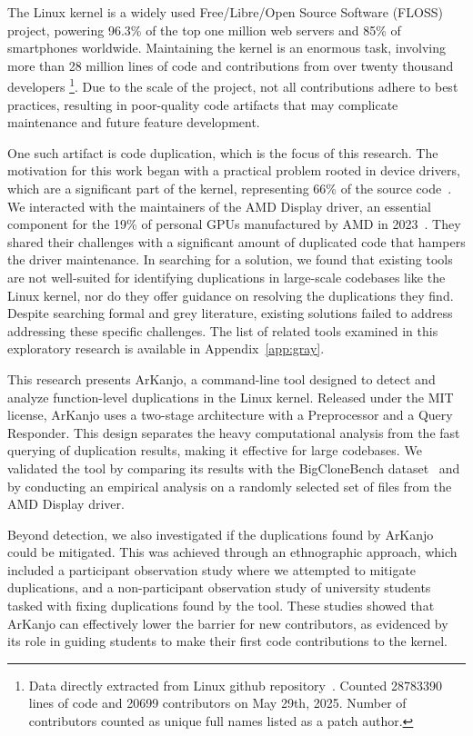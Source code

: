 \en

The Linux kernel is a widely used Free/Libre/Open Source Software (FLOSS) project, 
powering 96.3\% of the top one million web servers and 85\% of smartphones worldwide. 
Maintaining the kernel is an enormous task, involving more than 28 million lines of 
code and contributions from over twenty thousand developers
\footnote{Data directly extracted from Linux github repository~\citep{linuxrepo}.
Counted  28783390 lines of code and 20699 contributors on May 29th, 2025.
Number of contributors counted as unique full names listed as a patch author.}.
Due to the scale of the project, not all contributions adhere to best practices, resulting 
in poor-quality code artifacts that may complicate maintenance and future feature development.

One such artifact is code duplication, which is the focus of this research. The motivation for 
this work began with a practical problem rooted in device drivers, which are a significant part 
of the kernel, representing 66\% of the source code~\citep{marcelo}. We interacted with the 
maintainers of the AMD Display driver, an essential component for the 19\% of personal GPUs 
manufactured by AMD in 2023~\citep{gpumarket}. They shared their challenges with a significant 
amount of duplicated code that hampers the driver maintenance. In searching for a solution, 
we found that existing tools are not well-suited for identifying duplications in large-scale 
codebases like the Linux kernel, nor do they offer guidance on resolving the duplications 
they find. Despite searching formal and grey literature, existing solutions failed to address
addressing these specific challenges. The list of related tools examined in this exploratory 
research is available in Appendix~\ref{app:gray}.

This research presents ArKanjo, a command-line tool designed to detect and analyze function-level 
duplications in the Linux kernel. Released under the MIT license, ArKanjo uses a two-stage 
architecture with a Preprocessor and a Query Responder. This design separates the heavy 
computational analysis from the fast querying of duplication results, making it effective for 
large codebases. We validated the tool by comparing its results with the BigCloneBench
dataset~\citep{bigclonebench} and by conducting an empirical analysis on a randomly selected set of 
files from the AMD Display driver.

Beyond detection, we also investigated if the duplications found by ArKanjo could be mitigated.
This was achieved through an ethnographic approach, which included a participant observation 
study where we attempted to mitigate duplications, and a non-participant observation study of 
university students tasked with fixing duplications found by the tool. These studies showed that 
ArKanjo can effectively lower the barrier for new contributors, as evidenced by its role in 
guiding students to make their first code contributions to the kernel.

